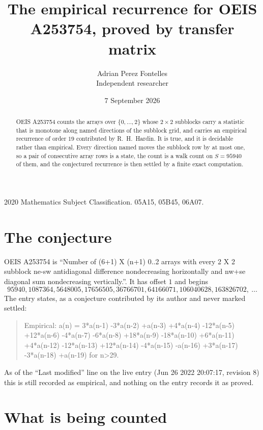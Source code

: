 \documentclass[11pt,a4paper]{article}
\title{The empirical recurrence for OEIS A253754, proved by transfer matrix}
\author{Adrian Perez Fontelles\\ \small Independent researcher}
\date{7 September 2026}
\theoremstyle{plain}
\theoremstyle{definition}
\begin{document}
\maketitle

\begin{abstract}
OEIS A253754 counts the arrays over $\{0,\dots,2\}$ whose $2\times2$ subblocks carry a
statistic that is monotone along named directions of the subblock grid, and carries an
empirical recurrence of order $19$ contributed by R.~H.~Hardin. It is true, and it is
decidable rather than empirical. Every direction named moves the subblock row by at most one,
so a pair of consecutive array rows is a state, the count is a walk count on $S=95940$ of them,
and the conjectured recurrence is then settled by a finite exact computation.
\end{abstract}

\noindent\small 2020 Mathematics Subject Classification. 05A15, 05B45, 06A07.\normalsize

\section{The conjecture}

OEIS A253754 is ``Number of (6+1) X (n+1) 0..2 arrays with every 2 X 2 subblock ne-sw antidiagonal difference nondecreasing horizontally and nw+se diagonal sum nondecreasing vertically.''. It has offset $1$ and begins
\[
95940, 1087364, 5648005, 17656505, 36766701, 64166071, 106040628, 163826702,\ \dots
\]
The entry states, as a conjecture contributed by its author and never marked settled:
\begin{quote}
Empirical: a(n) = 3*a(n-1) -3*a(n-2) +a(n-3) +4*a(n-4) -12*a(n-5) +12*a(n-6) -4*a(n-7) -6*a(n-8) +18*a(n-9) -18*a(n-10) +6*a(n-11) +4*a(n-12) -12*a(n-13) +12*a(n-14) -4*a(n-15) -a(n-16) +3*a(n-17) -3*a(n-18) +a(n-19) for n>29.
\end{quote}
As of the ``Last modified'' line on the live entry (Jun 26 2022 20:07:17, revision 8) this is still
recorded as empirical, and nothing on the entry records it as proved.

\section{What is being counted}
\end{document}
